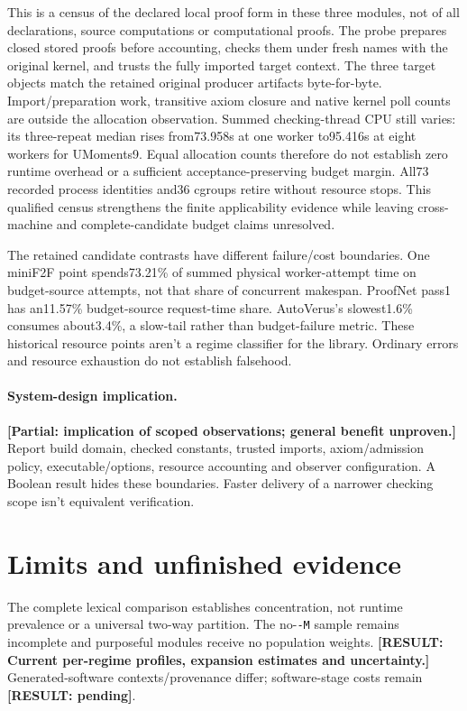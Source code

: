 \documentclass[10pt,twocolumn]{article}
\newcommand{\missing}[1]{\textbf{[RESULT: #1]}}
\newcommand{\partialev}[1]{\textbf{[Partial: #1]}}
\begin{document}
This is a census of the declared local proof form in these three modules,
not of all declarations, source computations or computational proofs.
The probe prepares closed stored proofs before accounting, checks them under
fresh names with the original kernel, and trusts the fully imported target
context. The three target objects match the retained original producer
artifacts byte-for-byte. Import/preparation work, transitive axiom closure
and native kernel poll counts are outside the allocation observation.
Summed checking-thread CPU still varies: its three-repeat median rises
from73.958s at one worker to95.416s at eight workers for UMoments9.
Equal allocation counts therefore do not establish zero runtime overhead
or a sufficient acceptance-preserving budget margin.
All73 recorded process identities and36 cgroups retire without resource
stops. This qualified census strengthens the finite applicability evidence
while leaving cross-machine and complete-candidate budget claims unresolved.

The retained candidate contrasts have different failure/cost boundaries.
One miniF2F point spends73.21\% of summed physical worker-attempt time on
budget-source attempts, not that share of concurrent makespan.
ProofNet pass1 has an11.57\% budget-source request-time share.
AutoVerus's slowest1.6\% consumes about3.4\%, a slow-tail rather than
budget-failure metric.
These historical resource points aren't a regime classifier for the library.
Ordinary errors and resource exhaustion do not establish falsehood.

\paragraph{System-design implication.}
\partialev{implication of scoped observations; general benefit unproven.}
Report build domain, checked constants, trusted imports, axiom/admission
policy, executable/options, resource accounting and observer configuration.
A Boolean result hides these boundaries.
Faster delivery of a narrower checking scope isn't equivalent verification.

\section{Limits and unfinished evidence}
The complete lexical comparison establishes concentration, not runtime
prevalence or a universal two-way partition.
The no-\texttt{-M} sample remains incomplete and purposeful modules receive
no population weights.
\missing{Current per-regime profiles, expansion estimates and uncertainty.}
Generated-software contexts/provenance differ; software-stage costs remain
\missing{pending}.
\end{document}
